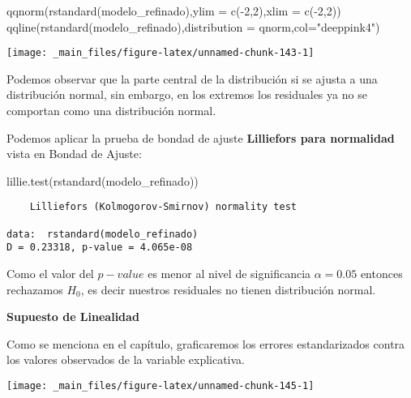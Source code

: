 \documentclass[
  a4paper,
  oneside,
  openany]{book}
\newenvironment{Shaded}{\begin{snugshade}}{\end{snugshade}}
\newcommand{\AttributeTok}[1]{\textcolor[rgb]{0.77,0.63,0.00}{#1}}
\newcommand{\DecValTok}[1]{\textcolor[rgb]{0.00,0.00,0.81}{#1}}
\newcommand{\FunctionTok}[1]{\textcolor[rgb]{0.00,0.00,0.00}{#1}}
\newcommand{\NormalTok}[1]{#1}
\newcommand{\SpecialCharTok}[1]{\textcolor[rgb]{0.00,0.00,0.00}{#1}}
\newcommand{\StringTok}[1]{\textcolor[rgb]{0.31,0.60,0.02}{#1}}
\begin{document}
\begin{Shaded}
\begin{Highlighting}[]
\FunctionTok{qqnorm}\NormalTok{(}\FunctionTok{rstandard}\NormalTok{(modelo\_refinado),}\AttributeTok{ylim =} \FunctionTok{c}\NormalTok{(}\SpecialCharTok{{-}}\DecValTok{2}\NormalTok{,}\DecValTok{2}\NormalTok{),}\AttributeTok{xlim =} \FunctionTok{c}\NormalTok{(}\SpecialCharTok{{-}}\DecValTok{2}\NormalTok{,}\DecValTok{2}\NormalTok{))}
\FunctionTok{qqline}\NormalTok{(}\FunctionTok{rstandard}\NormalTok{(modelo\_refinado),}\AttributeTok{distribution =}\NormalTok{ qnorm,}\AttributeTok{col=}\StringTok{"deeppink4"}\NormalTok{)}
\end{Highlighting}
\end{Shaded}

\begin{center}\texttt{[image: \_main\_files/figure-latex/unnamed-chunk-143-1]} \end{center}

Podemos observar que la parte central de la distribución si se ajusta a una distribución normal, sin embargo, en los extremos los residuales ya no se comportan como una distribución normal.

Podemos aplicar la prueba de bondad de ajuste \textbf{Lilliefors para normalidad} vista en Bondad de Ajuste:

\begin{Shaded}
\begin{Highlighting}[]
\FunctionTok{lillie.test}\NormalTok{(}\FunctionTok{rstandard}\NormalTok{(modelo\_refinado))}
\end{Highlighting}
\end{Shaded}

\begin{verbatim}
    Lilliefors (Kolmogorov-Smirnov) normality test

data:  rstandard(modelo_refinado)
D = 0.23318, p-value = 4.065e-08
\end{verbatim}

Como el valor del \(p-value\) es menor al nivel de significancia \(\alpha=0.05\) entonces rechazamos \(H_{0}\), es decir nuestros residuales no tienen distribución normal.

\textbf{Supuesto de Linealidad}

Como se menciona en el capítulo, graficaremos los errores estandarizados contra los valores observados de la variable explicativa.

\begin{center}\texttt{[image: \_main\_files/figure-latex/unnamed-chunk-145-1]} \end{center}
\end{document}
